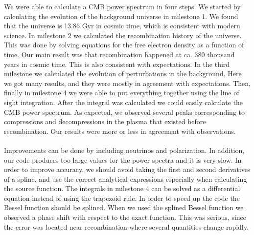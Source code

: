 \documentclass{aa}
\begin{document}
We were able to calculate a CMB power spectrum in four steps. We started by calculating the evolution of the background universe in milestone 1. We found that the universe is 13.86 Gyr in cosmic time,
which is consistent with modern science.
In milestone 2 we 
calculated the recombination history of the universe. This was done by solving equations for the free electron density as a function of time. Our main result was that recombination happened at ca. 380
thousand years in cosmic time. This is also consistent with expectations. In the third milestone we 
calculated the evolution of perturbations in the background. Here we got many results, and they were mostly in agreement with expectations.   
Then, finally in milestone 4 we were able to put everything together using the line of sight integration. After the integral 
was calculated we could easily calculate the CMB power spectrum. As expected, we observed several peaks corresponding to compressions and decompressions in the plasma
that existed before recombination. Our results were more or less in agreement with observations.\\
\\   
Improvements can be done by including neutrinos and polarization. In addition, our code produces too large values for the power spectra and it is very slow. In order to improve 
accuracy, we should avoid taking the first and second derivatives of a spline, and use the correct analytical expressions especially when calculating the source function. The integrals in milestone 4 can be solved
as a differential equation instead of using the trapezoid rule. In order to speed up the code the Bessel function should be splined. When we used the splined Bessel function
we observed a phase shift with respect to the exact function. This was serious, since the error was located near recombination where several quantities change rapidly.
 

%


%
\end{document}
